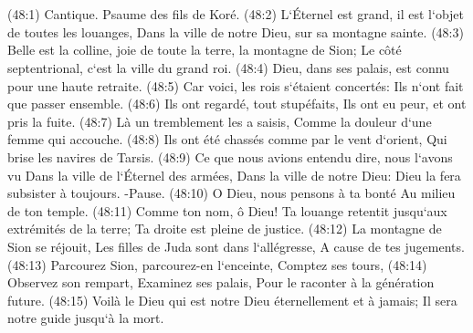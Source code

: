 \chapter{}

\verse (48:1) Cantique. Psaume des fils de Koré. (48:2) L`Éternel est grand, il est l`objet de toutes les louanges, Dans la ville de notre Dieu, sur sa montagne sainte. 
\verse (48:3) Belle est la colline, joie de toute la terre, la montagne de Sion; Le côté septentrional, c`est la ville du grand roi. 
\verse (48:4) Dieu, dans ses palais, est connu pour une haute retraite. 
\verse (48:5) Car voici, les rois s`étaient concertés: Ils n`ont fait que passer ensemble. 
\verse (48:6) Ils ont regardé, tout stupéfaits, Ils ont eu peur, et ont pris la fuite. 
\verse (48:7) Là un tremblement les a saisis, Comme la douleur d`une femme qui accouche. 
\verse (48:8) Ils ont été chassés comme par le vent d`orient, Qui brise les navires de Tarsis. 
\verse (48:9) Ce que nous avions entendu dire, nous l`avons vu Dans la ville de l`Éternel des armées, Dans la ville de notre Dieu: Dieu la fera subsister à toujours. -Pause. 
\verse (48:10) O Dieu, nous pensons à ta bonté Au milieu de ton temple. 
\verse (48:11) Comme ton nom, ô Dieu! Ta louange retentit jusqu`aux extrémités de la terre; Ta droite est pleine de justice. 
\verse (48:12) La montagne de Sion se réjouit, Les filles de Juda sont dans l`allégresse, A cause de tes jugements. 
\verse (48:13) Parcourez Sion, parcourez-en l`enceinte, Comptez ses tours, 
\verse (48:14) Observez son rempart, Examinez ses palais, Pour le raconter à la génération future. 
\verse (48:15) Voilà le Dieu qui est notre Dieu éternellement et à jamais; Il sera notre guide jusqu`à la mort. 

\chapter{}

